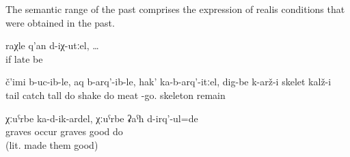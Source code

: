 The semantic range of the past  comprises the expression of realis conditions that were obtained in the past.
%
\begin{exe}
	\ex	\label{ex:If we were too late}
	\gll	raχle	q'an	d-iχ-utːel, \ldots\\
		if	late	be\\
	\glt	{}

	\ex	\label{ex:If you hold the tail (of the fish) and lift it up and shake it}
	\gll	č'imi	b-uc-ib-le,	aq	b-arq'-ib-le,	hak'	ka-b-arq'-itːel,	dig-be	k-arž-i	skelet	kalž-i\\
		tail	catch	tall	do shake	do	meat	-go.	skeleton	remain\\
	\glt	{}

	\ex	\label{ex:When/if graves fell down, (grandfather) put them up again}
	\gll	χːuˁrbe	ka-d-ik-ardel, 	χːuˁrbe	ʡaˁħ	d-irq'-ul=de\\
		graves	occur graves	good	do\\
	\glt	{} (lit. made them good)
\end{exe}

